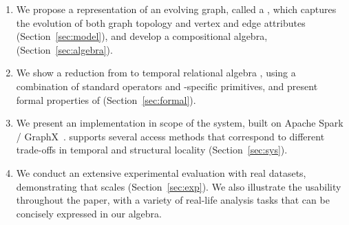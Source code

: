 \begin{enumerate}[noitemsep,leftmargin=*]

\item We propose a representation of an evolving graph, called a \tg,
  which captures the evolution of both graph topology and vertex and
  edge attributes (Section~\ref{sec:model}), and develop a
  compositional \tg algebra, \tga (Section~\ref{sec:algebra}).

\item We show a reduction from \tga to temporal relational algebra
  \tra, using a combination of standard operators and \tg-specific
  primitives, and present formal properties of \tga
  (Section~\ref{sec:formal}).

\item We present an implementation in scope of the \ql system, built
  on Apache Spark / GraphX~\cite{DBLP:conf/osdi/GonzalezXDCFS14}. \ql
  supports several access methods that correspond to different
  trade-offs in temporal and structural locality
  (Section~\ref{sec:sys}).

\item We conduct an extensive experimental evaluation with real
  datasets, demonstrating that \ql scales (Section~\ref{sec:exp}).  We
  also illustrate the usability throughout the paper, with a variety
  of real-life analysis tasks that can be concisely expressed in our
  algebra.

\end{enumerate}


